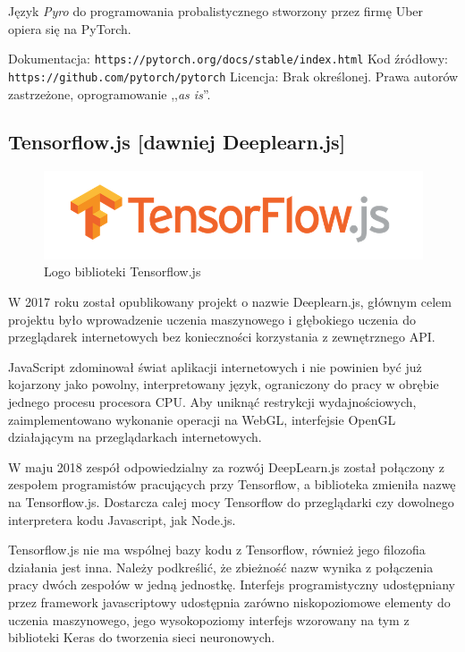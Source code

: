 \documentclass[12pt,a4paper,twoside,titlepage,openright]{book}
\begin{document}
Język \textit{Pyro} do programowania probalistycznego stworzony przez firmę Uber opiera się na PyTorch.\cite{book:2226069}

\noindent
\newline
Dokumentacja: \texttt{https://pytorch.org/docs/stable/index.html}
\newline
Kod źródłowy: \texttt{https://github.com/pytorch/pytorch}
\newline
Licencja: Brak określonej. Prawa autorów zastrzeżone, oprogramowanie ,,\textit{as is}''.


\subsection{Tensorflow.js [dawniej Deeplearn.js]}
\begin{figure}[ht]
	\centering
			\includegraphics[resolution=100, scale=0.6]{TensorflowJS.png}
		\caption{Logo biblioteki Tensorflow.js}
\end{figure}

W 2017 roku został opublikowany projekt o nazwie Deeplearn.js, głównym celem projektu było wprowadzenie uczenia maszynowego i głębokiego uczenia do przeglądarek internetowych bez konieczności korzystania z zewnętrznego API.

JavaScript zdominował świat aplikacji internetowych i nie powinien być już kojarzony jako powolny, interpretowany język, ograniczony do pracy w obrębie jednego procesu procesora CPU. \cite{siteSlowJavaScript} Aby uniknąć restrykcji wydajnościowych, zaimplementowano wykonanie operacji na WebGL, interfejsie OpenGL działającym na przeglądarkach internetowych.

W maju 2018 zespół odpowiedzialny za rozwój DeepLearn.js został połączony z zespołem programistów pracujących przy Tensorflow, a biblioteka zmieniła nazwę na Tensorflow.js. Dostarcza calej mocy Tensorflow do przeglądarki czy dowolnego interpretera kodu Javascript, jak Node.js.

Tensorflow.js nie ma wspólnej bazy kodu z Tensorflow, również jego filozofia działania jest inna. Należy podkreślić, że zbieżność nazw wynika z połączenia pracy dwóch zespołów w jedną jednostkę. Interfejs programistyczny udostępniany przez framework javascriptowy udostępnia zarówno niskopoziomowe elementy do uczenia maszynowego, jego wysokopoziomy interfejs wzorowany na tym z biblioteki Keras do tworzenia sieci neuronowych.
\end{document}
